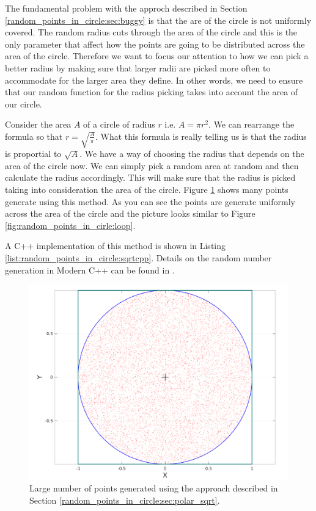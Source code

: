 The fundamental problem with the approch described in Section \ref{random_points_in_circle:sec:buggy} is that the are of the circle is not uniformly covered. The random radius cuts through the area of the circle and this is the only parameter that affect how the points are going to be distributed across the area of the circle. Therefore we want to focus our attention to  how we can  pick a better radius by making sure that larger radii are picked more often to accommodate for the larger area they define. In other words, we need to ensure that our random function for the radius picking takes into account the area of our circle. 

Consider the area $A$ of a circle of radius $r$ i.e.  $A = \pi r^2$. We can rearrange the formula so that $r = \sqrt{\frac{A}{\pi}}$. What this formula is really telling us is that the radius is proportial to $\sqrt{A}$. We have a way of choosing the radius that depends on the area of the circle now. We can simply pick a random area at  random and then calculate the radius accordingly. This will make sure that the radius is picked taking into consideration the area of the circle. Figure \ref{fig:random_points_in_cirle:polar_sqrt} shows many points generate using this method. As you can see the points are generate uniformly across the area of the circle and the picture looks similar to Figure \ref{fig:random_points_in_cirle:loop}.

A C++ implementation of this method is shown in Listing \ref{list:random_points_in_circle:sqrtcpp}. Details on the random number generation in Modern C++ can be found in \cite{cit::std::random}.



\begin{figure}
	\label{fig:random_points_in_cirle:polar_sqrt}
	\centering
	\includegraphics[scale=0.3]{sources/random_points_in_circle/images/sqrt_points}
	\caption{Large number of points generated using the approach described in Section \ref{random_points_in_circle:sec:polar_sqrt}.}
\end{figure}

